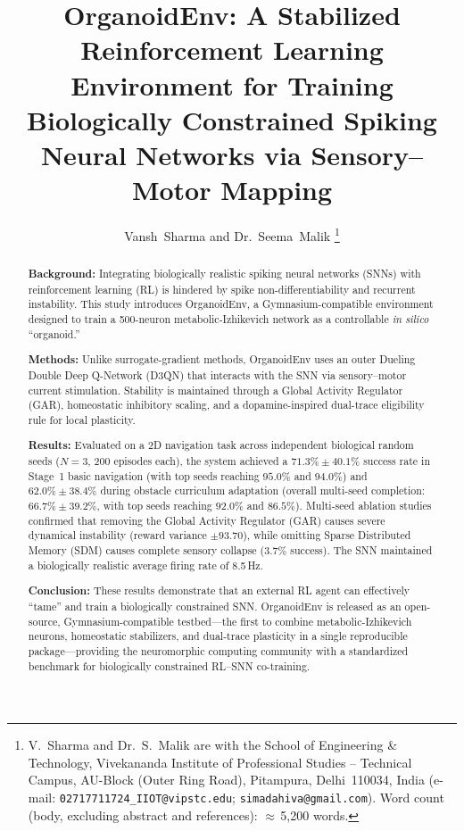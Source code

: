 \documentclass[journal,twocolumn]{IEEEtran}
\begin{document}
\title{OrganoidEnv: A Stabilized Reinforcement Learning Environment for
Training Biologically Constrained Spiking Neural Networks via
Sensory--Motor Mapping}

\author{Vansh~Sharma and Dr.~Seema~Malik%
\thanks{V.~Sharma and Dr.~S.~Malik are with the School of Engineering
\& Technology, Vivekananda Institute of Professional Studies --
Technical Campus, AU-Block (Outer Ring Road), Pitampura,
Delhi~110034, India (e-mail: \texttt{02717711724\_IIOT@vipstc.edu};
\texttt{simadahiva@gmail.com}).
Word count (body, excluding abstract and references):
$\approx$\,5{,}200 words.}}


\maketitle

\begin{abstract}
\textbf{Background:} Integrating biologically realistic spiking neural
networks (SNNs) with reinforcement learning (RL) is hindered by spike
non-differentiability and recurrent instability.  This study introduces
OrganoidEnv, a Gymnasium-compatible environment designed to train a
500-neuron metabolic-Izhikevich network as a controllable \emph{in
silico} ``organoid.''

\textbf{Methods:} Unlike surrogate-gradient methods, OrganoidEnv uses
an outer Dueling Double Deep Q-Network (D3QN) that interacts with the
SNN via sensory--motor current stimulation.  Stability is maintained
through a Global Activity Regulator (GAR), homeostatic inhibitory
scaling, and a dopamine-inspired dual-trace eligibility rule for local
plasticity.

\textbf{Results:} Evaluated on a 2D navigation task across independent biological random seeds ($N=3$, 200 episodes each), the system achieved a $71.3\% \pm 40.1\%$ success rate in Stage~1 basic navigation (with top seeds reaching $95.0\%$ and $94.0\%$) and $62.0\% \pm 38.4\%$ during obstacle curriculum adaptation (overall multi-seed completion: $66.7\% \pm 39.2\%$, with top seeds reaching $92.0\%$ and $86.5\%$). Multi-seed ablation studies confirmed that removing the Global Activity Regulator (GAR) causes severe dynamical instability (reward variance $\pm 93.70$), while omitting Sparse Distributed Memory (SDM) causes complete sensory collapse ($3.7\%$ success). The SNN maintained a biologically realistic average firing rate of 8.5\,Hz.

\textbf{Conclusion:} These results demonstrate that an external RL agent can effectively ``tame'' and train a biologically constrained SNN. OrganoidEnv is released as an open-source, Gymnasium-compatible testbed---the first to combine metabolic-Izhikevich neurons, homeostatic stabilizers, and dual-trace plasticity in a single reproducible package---providing the neuromorphic computing community with a standardized benchmark for biologically constrained RL--SNN co-training.
\end{abstract}
\end{document}
